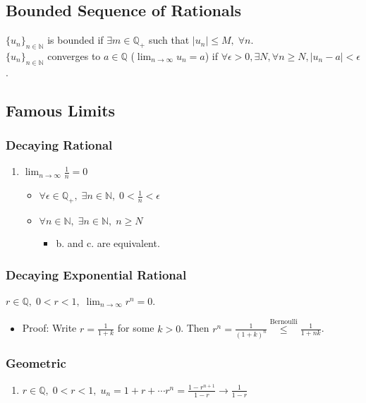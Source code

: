 \documentclass[11pt]{article}
\newcommand{\0}{\emptyset}
\newcommand{\N}{\mathbb{N}}
\newcommand{\Q}{\mathbb{Q}}
\begin{document}
\subsection*{Bounded Sequence of Rationals}
\label{sec:org6d1a5cf}
\(\{u_{n}\}_{n\in\N}\) is bounded if \(\exists m\in\Q_{+}\) such that \(|u_{n}|\leq M,\;\forall n\).\\[0pt]
\(\{u_{n}\}_{n\in\N}\) converges to \(a\in\Q\) (\(\lim_{n\to\infty}u_{n}=a\)) if \(\forall\epsilon>0,\exists N,\forall n\geq N,|u_{n}-a|<\epsilon\).\\[0pt]
\subsection*{Famous Limits}
\label{sec:org6928717}
\subsubsection*{Decaying Rational}
\label{sec:orgc028d20}
\begin{enumerate}
\item \(\lim_{n\to\infty}\frac{1}{n} = 0\)\\[0pt]
\begin{itemize}
\item \(\forall\epsilon\in\Q_{+},\;\exists n\in\N,\;0<\frac{1}{n}<\epsilon\)\\[0pt]
\item \(\forall n\in\N,\;\exists n\in\N,\;n\geq N\)\\[0pt]
\begin{itemize}
\item b. and c. are equivalent.\\[0pt]
\end{itemize}
\end{itemize}
\end{enumerate}
\subsubsection*{Decaying Exponential Rational}
\label{sec:org372317d}
\(r\in\Q,\;0<r<1,\;\lim_{n\to\infty}r^{n}=0\).\\[0pt]
\begin{itemize}
\item Proof:
\label{sec:org76076ab}
Write \(r=\frac{1}{1+k}\) for some \(k>0\). Then \(r^{n}=\frac{1}{(1+k)^{n}} \overset{\text{Bernoulli}}{\leq} \frac{1}{1+nk}\).\\[0pt]
\end{itemize}
\subsubsection*{Geometric}
\label{sec:org6288e3f}
\begin{enumerate}
\item \(r\in\Q,\;0<r<1,\;u_{n}=1+r+\cdots r^{n}=\frac{1-r^{n+1}}{1-r} \to \frac{1}{1-r}\)\\[0pt]
\end{enumerate}
\end{document}
